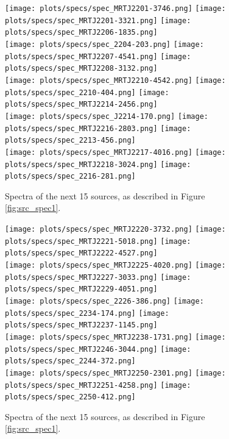 \documentclass[preprint]{aastex}
\begin{document}
\begin{figure}\centering
\texttt{[image: plots/specs/spec\_MRTJ2201-3746.png]}
\texttt{[image: plots/specs/spec\_MRTJ2201-3321.png]}
\texttt{[image: plots/specs/spec\_MRTJ2206-1835.png]}\\
\texttt{[image: plots/specs/spec\_2204-203.png]}
\texttt{[image: plots/specs/spec\_MRTJ2207-4541.png]}
\texttt{[image: plots/specs/spec\_MRTJ2208-3132.png]}\\
\texttt{[image: plots/specs/spec\_MRTJ2210-4542.png]}
\texttt{[image: plots/specs/spec\_2210-404.png]}
\texttt{[image: plots/specs/spec\_MRTJ2214-2456.png]}\\
\texttt{[image: plots/specs/spec\_J2214-170.png]}
\texttt{[image: plots/specs/spec\_MRTJ2216-2803.png]}
\texttt{[image: plots/specs/spec\_2213-456.png]}\\
\texttt{[image: plots/specs/spec\_MRTJ2217-4016.png]}
\texttt{[image: plots/specs/spec\_MRTJ2218-3024.png]}
\texttt{[image: plots/specs/spec\_2216-281.png]}\\
\caption{Spectra of the next 15 sources, as described in Figure \ref{fig:src_spec1}.
}\label{fig:src_spec30}
\end{figure}\clearpage

\begin{figure}\centering
\texttt{[image: plots/specs/spec\_MRTJ2220-3732.png]}
\texttt{[image: plots/specs/spec\_MRTJ2221-5018.png]}
\texttt{[image: plots/specs/spec\_MRTJ2222-4527.png]}\\
\texttt{[image: plots/specs/spec\_MRTJ2225-4020.png]}
\texttt{[image: plots/specs/spec\_MRTJ2227-3033.png]}
\texttt{[image: plots/specs/spec\_MRTJ2229-4051.png]}\\
\texttt{[image: plots/specs/spec\_2226-386.png]}
\texttt{[image: plots/specs/spec\_2234-174.png]}
\texttt{[image: plots/specs/spec\_MRTJ2237-1145.png]}\\
\texttt{[image: plots/specs/spec\_MRTJ2238-1731.png]}
\texttt{[image: plots/specs/spec\_MRTJ2246-3044.png]}
\texttt{[image: plots/specs/spec\_2244-372.png]}\\
\texttt{[image: plots/specs/spec\_MRTJ2250-2301.png]}
\texttt{[image: plots/specs/spec\_MRTJ2251-4258.png]}
\texttt{[image: plots/specs/spec\_2250-412.png]}\\
\caption{Spectra of the next 15 sources, as described in Figure \ref{fig:src_spec1}.
}\label{fig:src_spec31}
\end{figure}\clearpage
\end{document}
